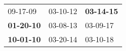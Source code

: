 \begin{supertabular}{p{0.33\columnwidth}p{0.33\columnwidth}p{0.33\columnwidth}}
          09-17-09\textsuperscript{} &  03-10-12\textsuperscript{} &  \textbf{03-14-15\textsuperscript{}} \\
 \textbf{01-20-10\textsuperscript{}} &  03-08-13\textsuperscript{} &           03-09-17\textsuperscript{} \\
 \textbf{10-01-10\textsuperscript{}} &  03-20-14\textsuperscript{} &           03-10-18\textsuperscript{} \\
\end{supertabular}
